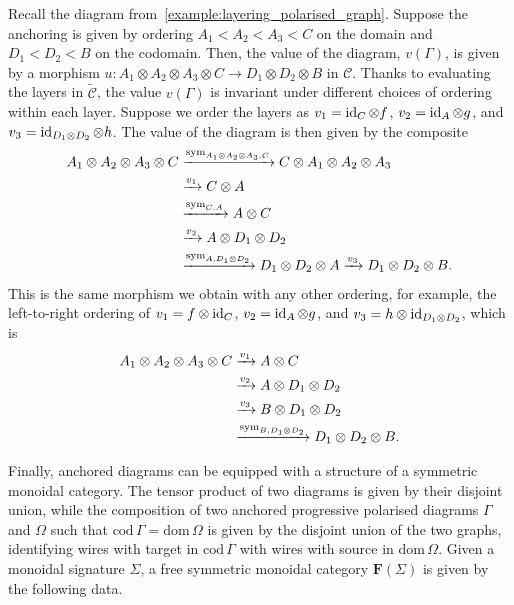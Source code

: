\begin{example}
Recall the diagram from~\cref{example:layering_polarised_graph}.
Suppose the anchoring is given by ordering $A_1 < A_2 < A_3 < C$ on the domain and $D_1 < D_2 < B$ on the codomain.
Then, the value of the diagram, $v(\Gamma)$, is given by a morphism $u : A_1 \otimes A_2 \otimes A_3 \otimes C \to D_1 \otimes D_2 \otimes B$ in $\mathcal{C}$.
Thanks to evaluating the layers in $\widetilde{\mathcal{C}}$, the value $v(\Gamma)$ is invariant under different choices of ordering within each layer.
Suppose we order the layers as $v_1 = \operatorname{id}_C \otimes f$, $v_2 = \operatorname{id}_A \otimes g$, and $v_3 = \operatorname{id}_{D_1 \otimes D_2} \otimes h$.
The value of the diagram is then given by the composite
\begin{align*}
A_1 \otimes A_2 \otimes A_3 \otimes C &\xrightarrow{\operatorname{sym}_{A_1 \otimes A_2 \otimes A_3, C}} C \otimes A_1 \otimes A_2 \otimes A_3\\
&\xrightarrow{v_1} C \otimes A\\
&\xrightarrow{\operatorname{sym}_{C,A}} A \otimes C\\
&\xrightarrow{v_2} A \otimes D_1 \otimes D_2\\
&\xrightarrow{\operatorname{sym}_{A, D_1 \otimes D_2}} D_1 \otimes D_2 \otimes A \xrightarrow{v_3} D_1 \otimes D_2 \otimes B .
\end{align*} 
This is the same morphism we obtain with any other ordering, for example, the left-to-right ordering of $v_1 = f \otimes \operatorname{id}_C$, $v_2 = \operatorname{id}_{A} \otimes g$, and $v_3 = h \otimes \operatorname{id}_{D_1 \otimes D_2}$, which is
\begin{align*}
A_1 \otimes A_2 \otimes A_3 \otimes C &\xrightarrow{v_1} A \otimes C\\
&\xrightarrow{v_2} A \otimes D_1 \otimes D_2\\
&\xrightarrow{v_3} B \otimes D_1 \otimes D_2\\
&\xrightarrow{\operatorname{sym}_{B, D_1 \otimes D_2}} D_1 \otimes D_2 \otimes B.
\end{align*}
\end{example}

Finally, anchored diagrams can be equipped with a structure of a symmetric monoidal category.
The tensor product of two diagrams is given by their disjoint union, while the composition of two anchored progressive polarised diagrams $\Gamma$ and $\Omega$ such that $\mathrm{cod}\,\Gamma = \mathrm{dom}\,\Omega$ is given by the disjoint union of the two graphs, identifying wires with target in $\mathrm{cod}\,\Gamma$ with wires with source in $\mathrm{dom}\,\Omega$.
Given a monoidal signature $\Sigma$, a free symmetric monoidal category $\mathbf{F}(\Sigma)$ is given by the following data.
